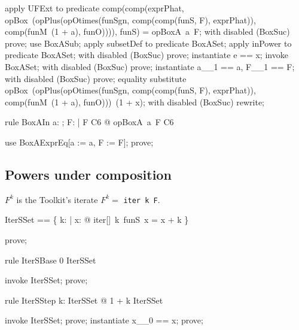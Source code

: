 \documentclass{article}
\begin{document}
\begin{zproof}
apply UFExt to predicate comp(comp(exprPhat, opBox~(opPlus(opOtimes(funSgn, comp(comp(funS, F), exprPhat)), comp(funM~(1 + a), funO)))), funS) = opBoxA~a~F;
with disabled (BoxSuc) prove;
use BoxASub;
apply subsetDef to predicate \nat \subseteq BoxASet;
apply inPower to predicate \nat \in \power BoxASet;
with disabled (BoxSuc) prove;
instantiate e == x;
invoke BoxASet;
with disabled (BoxSuc) prove;
instantiate a\_\_1 == a, F\_\_1 == F;
with disabled (BoxSuc) prove;
equality substitute opBox~(opPlus(opOtimes(funSgn, comp(comp(funS, F), exprPhat)), comp(funM~(1 + a), funO)))~(1 + x);
with disabled (BoxSuc) rewrite;
\end{zproof}

\begin{theorem}{rule BoxAIn}
  \forall a: \nat; F: \nat \fun \nat | F \in C6 @ opBoxA~a~F \in C6
\end{theorem}

\begin{zproof}
use BoxAExprEq[a := a, F := F];
prove;
\end{zproof}

\subsection{Powers under composition}

$F^k$ is the Toolkit's iterate $F^k = $ \texttt{iter k F}.

\begin{zed}
  IterSSet == \{ k: \nat | \forall x: \nat @ iter[\nat]~k~funS~x = x + k \}
\end{zed}

\begin{zproof}
prove;
\end{zproof}

\begin{theorem}{rule IterSBase}
  0 \in IterSSet
\end{theorem}

\begin{zproof}
invoke IterSSet;
prove;
\end{zproof}

\begin{theorem}{rule IterSStep}
  \forall k: IterSSet @ 1 + k \in IterSSet
\end{theorem}

\begin{zproof}
invoke IterSSet;
prove;
instantiate x\_\_0 == x;
prove;
\end{zproof}
\end{document}
